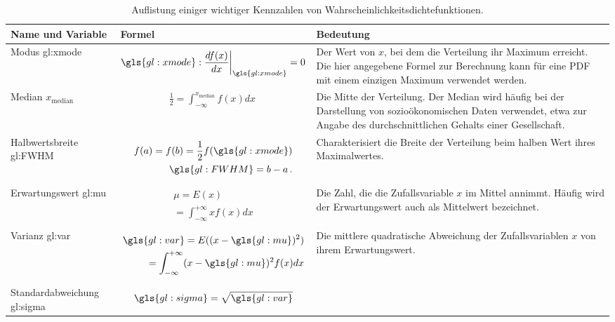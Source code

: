 \begin{longtable}{p{3cm}|p{6cm}|p{5cm}}
\caption{Auflistung einiger wichtiger Kennzahlen von Wahrscheinlichkeitsdichtefunktionen.} \\
\textbf{Name und Variable} & \textbf{Formel} & \textbf{Bedeutung} \\ \hline \hline
Modus \gls{gl:xmode} & \begin{align}
\gls{gl:xmode}: \frac{d f ( x )}{dx}\bigg|_{\gls{gl:xmode}} = 0 
\end{align} & Der Wert von $x$, bei dem die Verteilung ihr Maximum erreicht. Die hier angegebene Formel zur Berechnung kann für eine PDF mit einem einzigen Maximum verwendet werden. \\ \hline 
Median $x_{\mathrm{median}}$ & \begin{align}
\frac{1}{2} = \int_{-\infty}^{x_{\mathrm{median}}} f ( x ) dx\
\end{align}  & Die Mitte der Verteilung. Der Median wird häufig bei der Darstellung von sozioökonomischen Daten verwendet, etwa zur Angabe des durchschnittlichen Gehalts einer Gesellschaft. \\ \hline
Halbwertsbreite  \gls{gl:FWHM} & \begin{align} \begin{split}
f ( a ) = f ( b ) = \frac{1}{2} f (\gls{gl:xmode} ) \\  \gls{gl:FWHM} = b - a\,.
\end{split} \end{align} & Charakterisiert die Breite der Verteilung beim halben Wert ihres Maximalwertes. \\ \hline
Erwartungswert \gls{gl:mu} & \begin{align} \begin{split} \mu = E(x) \\ = \int_{-\infty}^{+\infty} xf(x)dx \end{split} \end{align} & Die Zahl, die die Zufallsvariable $x$ im Mittel annimmt. Häufig wird der Erwartungswert auch als Mittelwert bezeichnet. \\ \hline
Varianz \gls{gl:var} &   \begin{align} \begin{split} \gls{gl:var} = E((x-\gls{gl:mu})^2) \\ = \int_{-\infty}^{+\infty} (x-\gls{gl:mu})^2f(x)dx \end{split} \end{align} &  Die mittlere quadratische Abweichung der Zufallsvariablen $x$ von ihrem Erwartungswert. \\ \hline
Standardabweichung \gls{gl:sigma} & \begin{align} \gls{gl:sigma} = \sqrt{\gls{gl:var}} \end{align} 
\label{tab:pdfs}
\end{longtable}

